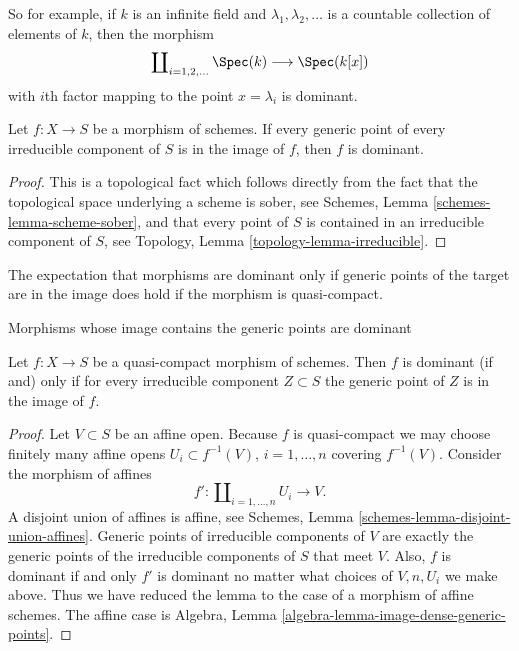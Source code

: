 \noindent
So for example, if $k$ is an infinite field and $\lambda_1, \lambda_2, \ldots$
is a countable collection of elements of $k$, then the morphism
$$
\coprod\nolimits_{i = 1, 2, \ldots } \Spec(k)
\longrightarrow
\Spec(k[x])
$$
with $i$th factor mapping to the point $x = \lambda_i$ is dominant.

\begin{lemma}
\label{lemma-generic-points-in-image-dominant}
Let $f : X \to S$ be a morphism of schemes.
If every generic point of every irreducible component of $S$
is in the image of $f$, then $f$ is dominant.
\end{lemma}

\begin{proof}
This is a topological fact which follows directly from the fact that
the topological space underlying a scheme is sober, see
Schemes, Lemma \ref{schemes-lemma-scheme-sober}, and that
every point of $S$ is contained in an irreducible component of
$S$, see Topology, Lemma \ref{topology-lemma-irreducible}.
\end{proof}

\noindent
The expectation that morphisms are dominant only if generic points of the
target are in the image does hold if the morphism is quasi-compact.

\begin{lemma}
\label{lemma-quasi-compact-dominant}
\begin{slogan}
Morphisms whose image contains the generic points are dominant
\end{slogan}
Let $f : X \to S$ be a quasi-compact morphism of schemes.
Then $f$ is dominant (if and) only if for every irreducible
component $Z \subset S$ the generic point of $Z$ is in the
image of $f$.
\end{lemma}

\begin{proof}
Let $V \subset S$ be an affine open.
Because $f$ is quasi-compact we may choose finitely many affine
opens $U_i \subset f^{-1}(V)$, $i = 1, \ldots, n$ covering
$f^{-1}(V)$. Consider the morphism of affines
$$
f' :
\coprod\nolimits_{i = 1, \ldots, n} U_i
\longrightarrow
V.
$$
A disjoint union of affines is affine, see
Schemes, Lemma \ref{schemes-lemma-disjoint-union-affines}.
Generic points of irreducible components of $V$
are exactly the generic points of the irreducible components of
$S$ that meet $V$. Also, $f$ is dominant if and only $f'$ is dominant
no matter what choices of $V, n, U_i$ we make above. Thus we
have reduced the lemma to the case of a morphism of affine schemes.
The affine case is
Algebra, Lemma \ref{algebra-lemma-image-dense-generic-points}.
\end{proof}

